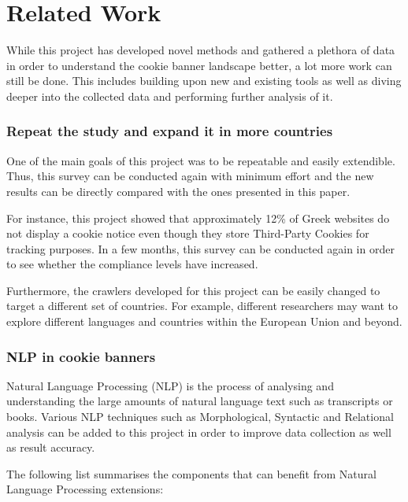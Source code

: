 \documentclass[../main.tex]{subfiles}
\begin{document}
\section{Related Work}
While this project has developed novel methods and gathered a plethora of data in order to understand the cookie banner landscape better, a lot more work can still be done. This includes building upon new and existing tools as well as diving deeper into the collected data and performing further analysis of it.

\subsubsection{Repeat the study and expand it in more countries}
One of the main goals of this project was to be repeatable and easily extendible. Thus, this survey can be conducted again with minimum effort and the new results can be directly compared with the ones presented in this paper. 

For instance, this project showed that approximately 12\% of Greek websites do not display a cookie notice even though they store Third-Party Cookies for tracking purposes. In a few months, this survey can be conducted again in order to see whether the compliance levels have increased. 

Furthermore, the crawlers developed for this project can be easily changed to target a different set of countries. For example, different researchers may want to explore different languages and countries within the European Union and beyond.

\subsubsection{NLP in cookie banners}
Natural Language Processing (NLP) is the process of analysing and understanding the large amounts of natural language text such as transcripts or books. Various NLP techniques such as Morphological, Syntactic and Relational analysis \cite{manning2014stanford} can be added to this project in order to improve data collection as well as result accuracy. 

The following list summarises the components that can benefit from Natural Language Processing extensions:
\end{document}
